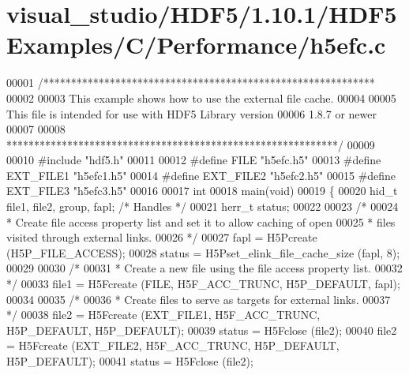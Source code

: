 \hypertarget{visual__studio_2_h_d_f5_21_810_81_2_h_d_f5_examples_2_c_2_performance_2h5efc_8c_source}{}\section{visual\+\_\+studio/\+H\+D\+F5/1.10.1/\+H\+D\+F5\+Examples/\+C/\+Performance/h5efc.c}
\label{visual__studio_2_h_d_f5_21_810_81_2_h_d_f5_examples_2_c_2_performance_2h5efc_8c_source}

\begin{DoxyCode}
00001 \textcolor{comment}{/************************************************************}
00002 \textcolor{comment}{}
00003 \textcolor{comment}{  This example shows how to use the external file cache.}
00004 \textcolor{comment}{}
00005 \textcolor{comment}{  This file is intended for use with HDF5 Library version}
00006 \textcolor{comment}{  1.8.7 or newer}
00007 \textcolor{comment}{}
00008 \textcolor{comment}{ ************************************************************/}
00009 
00010 \textcolor{preprocessor}{#include "hdf5.h"}
00011 
00012 \textcolor{preprocessor}{#define FILE            "h5efc.h5"}
00013 \textcolor{preprocessor}{#define EXT\_FILE1       "h5efc1.h5"}
00014 \textcolor{preprocessor}{#define EXT\_FILE2       "h5efc2.h5"}
00015 \textcolor{preprocessor}{#define EXT\_FILE3       "h5efc3.h5"}
00016 
00017 \textcolor{keywordtype}{int}
00018 main(\textcolor{keywordtype}{void})
00019 \{
00020     hid\_t       file1, file2, group, fapl;      \textcolor{comment}{/* Handles */}
00021     herr\_t      status;
00022 
00023     \textcolor{comment}{/*}
00024 \textcolor{comment}{     * Create file access property list and set it to allow caching of open}
00025 \textcolor{comment}{     * files visited through external links.}
00026 \textcolor{comment}{     */}
00027     fapl = H5Pcreate (H5P\_FILE\_ACCESS);
00028     status = H5Pset\_elink\_file\_cache\_size (fapl, 8);
00029 
00030     \textcolor{comment}{/*}
00031 \textcolor{comment}{     * Create a new file using the file access property list.}
00032 \textcolor{comment}{     */}
00033     file1 = H5Fcreate (FILE, H5F\_ACC\_TRUNC, H5P\_DEFAULT, fapl);
00034 
00035     \textcolor{comment}{/*}
00036 \textcolor{comment}{     * Create files to serve as targets for external links.}
00037 \textcolor{comment}{     */}
00038     file2 = H5Fcreate (EXT\_FILE1, H5F\_ACC\_TRUNC, H5P\_DEFAULT, H5P\_DEFAULT);
00039     status = H5Fclose (file2);
00040     file2 = H5Fcreate (EXT\_FILE2, H5F\_ACC\_TRUNC, H5P\_DEFAULT, H5P\_DEFAULT);
00041     status = H5Fclose (file2);

\end{DoxyCode}
